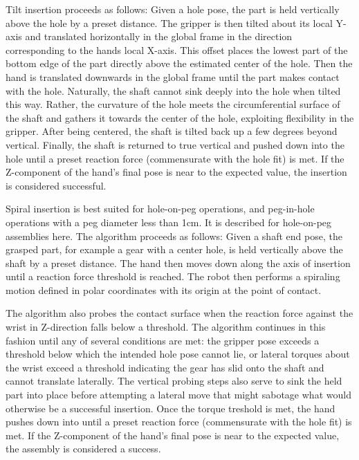 Tilt insertion proceeds as follows: Given a hole pose, the part is held vertically above the hole by a preset distance. The gripper is then tilted about its local Y-axis and translated horizontally in the global frame in the direction corresponding to the hands local X-axis.  This offset places the lowest part of the bottom edge of the part directly above the estimated center of the hole.  Then the hand is translated downwards in the global frame until the part makes contact with the hole.  Naturally, the shaft cannot sink deeply into the hole when tilted this way.  Rather, the curvature of the hole meets the circumferential surface of the shaft and gathers it towards the center of the hole, exploiting flexibility in the gripper.  After being centered, the shaft is tilted back up a few degrees beyond vertical. Finally, the shaft is returned to true vertical and pushed down into the hole until a preset reaction force (commensurate with the hole fit) is met.  If the Z-component of the hand's final pose is near to the expected value, the insertion is considered successful.


Spiral insertion is best suited for hole-on-peg operations, and peg-in-hole operations with a peg diameter less than 1cm. It is described for hole-on-peg assemblies here. The algorithm proceeds as follows: Given a shaft end pose, the grasped part, for example a gear with a center hole, is held vertically above the shaft by a preset distance.  The hand then moves down along the axis of insertion until a reaction force threshold is reached.  The robot then performs a spiraling motion defined in polar coordinates with its origin at the point of contact.

The algorithm also probes the contact surface when the reaction force against the wrist in Z-direction falls below a threshold.  The algorithm continues in this fashion until any of several conditions are met: the gripper pose exceeds a threshold below which the intended hole pose cannot lie, or lateral torques about the wrist exceed a threshold indicating the gear has slid onto the shaft and cannot translate laterally.  The vertical probing steps also serve to sink the held part into place before attempting a lateral move that might sabotage what would otherwise be a successful insertion.  Once the torque treshold is met, the hand pushes down into until a preset reaction force (commensurate with the hole fit) is met.  If the Z-component of the hand's final pose is near to the expected value, the assembly is considered a success.

